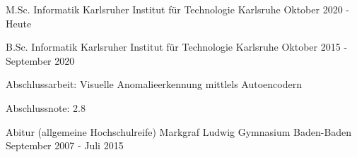 


\begin{cventries}


\cventry
{M.Sc. Informatik} %
{Karlsruher Institut für Technologie} %
{Karlsruhe} %
{Oktober 2020 - Heute} %
{ %
\begin{cvitems}
\end{cvitems}
}

\cventry
{B.Sc. Informatik} %
{Karlsruher Institut für Technologie} %
{Karlsruhe} %
{Oktober 2015 - September 2020} %
{ %
\begin{cvitems}
    \item{Abschlussarbeit: Visuelle Anomalieerkennung mittlels Autoencodern}
    \item{Abschlussnote: 2.8}
\end{cvitems}
}

\cventry
{Abitur (allgemeine Hochschulreife)} %
{Markgraf Ludwig Gymnasium} %
{Baden-Baden} %
{September 2007 - Juli 2015} %
{ %
\begin{cvitems}
\end{cvitems}
}

\end{cventries}